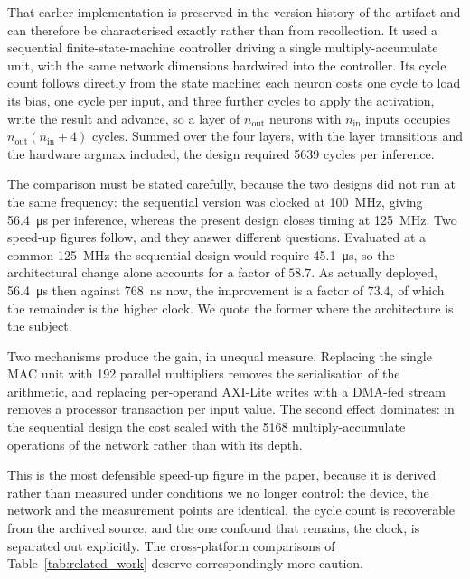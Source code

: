 \documentclass[final,5p,times,twocolumn]{elsarticle}
\begin{document}
That earlier implementation is preserved in the version history of the artifact
and can therefore be characterised exactly rather than from recollection. It used
a sequential finite-state-machine controller driving a single
multiply-accumulate unit, with the same network dimensions hardwired into the
controller. Its cycle count follows directly from the state machine: each neuron
costs one cycle to load its bias, one cycle per input, and three further cycles
to apply the activation, write the result and advance, so a layer of $n_{\text{out}}$
neurons with $n_{\text{in}}$ inputs occupies $n_{\text{out}}(n_{\text{in}}+4)$
cycles. Summed over the four layers, with the layer transitions and the hardware
argmax included, the design required \num{5639} cycles per inference.

The comparison must be stated carefully, because the two designs did not run at
the same frequency: the sequential version was clocked at \SI{100}{\mega\hertz},
giving \SI{56.4}{\micro\second} per inference, whereas the present design closes
timing at \SI{125}{\mega\hertz}. Two speed-up figures follow, and they answer
different questions. Evaluated at a common \SI{125}{\mega\hertz} the sequential
design would require \SI{45.1}{\micro\second}, so the architectural change alone
accounts for a factor of $58.7$. As actually deployed, \SI{56.4}{\micro\second}
then against \SI{768}{\nano\second} now, the improvement is a factor of $73.4$,
of which the remainder is the higher clock. We quote the former where the
architecture is the subject.

Two mechanisms produce the gain, in unequal measure. Replacing the single MAC
unit with 192 parallel multipliers removes the serialisation of the arithmetic,
and replacing per-operand AXI-Lite writes with a DMA-fed stream removes a
processor transaction per input value. The second effect dominates: in the
sequential design the cost scaled with the \num{5168} multiply-accumulate
operations of the network rather than with its depth.

This is the most defensible speed-up figure in the paper, because it is derived
rather than measured under conditions we no longer control: the device, the
network and the measurement points are identical, the cycle count is recoverable
from the archived source, and the one confound that remains, the clock, is
separated out explicitly. The cross-platform comparisons of
Table~\ref{tab:related_work} deserve correspondingly more caution.
\end{document}
